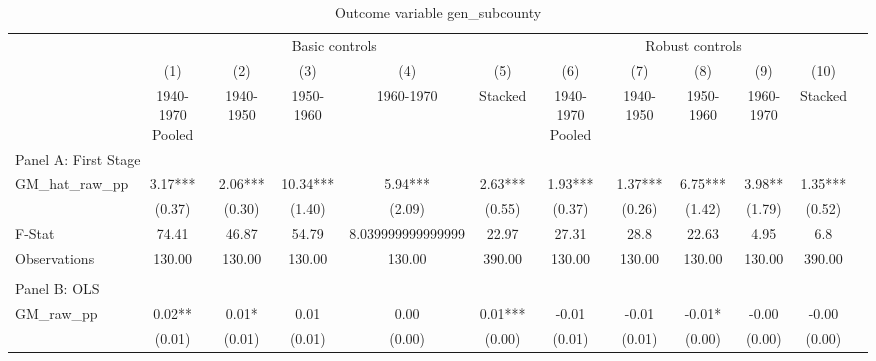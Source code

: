 \begin{table}[htbp]\centering {} \begin{threeparttable} \caption{Outcome variable gen\_subcounty } \begin{tabular}{l*{11}{c}} \toprule
          &\multicolumn{5}{c}{Basic controls}                                   &\multicolumn{5}{c}{Robust controls}                                  \\\cmidrule(lr){2-6}\cmidrule(lr){7-11}
          &\multicolumn{1}{c}{(1)}&\multicolumn{1}{c}{(2)}&\multicolumn{1}{c}{(3)}&\multicolumn{1}{c}{(4)}&\multicolumn{1}{c}{(5)}&\multicolumn{1}{c}{(6)}&\multicolumn{1}{c}{(7)}&\multicolumn{1}{c}{(8)}&\multicolumn{1}{c}{(9)}&\multicolumn{1}{c}{(10)}\\
          &\multicolumn{1}{c}{1940-1970 Pooled}&\multicolumn{1}{c}{1940-1950}&\multicolumn{1}{c}{1950-1960}&\multicolumn{1}{c}{1960-1970}&\multicolumn{1}{c}{Stacked}&\multicolumn{1}{c}{1940-1970 Pooled}&\multicolumn{1}{c}{1940-1950}&\multicolumn{1}{c}{1950-1960}&\multicolumn{1}{c}{1960-1970}&\multicolumn{1}{c}{Stacked}\\
\cmidrule(lr){1-11}
\multicolumn{10}{l}{Panel A: First Stage}\\
\cmidrule(lr){1-11}
GM\_hat\_raw\_pp&      3.17***&      2.06***&     10.34***&      5.94***&      2.63***&      1.93***&      1.37***&      6.75***&      3.98** &      1.35***\\
          &    (0.37)   &    (0.30)   &    (1.40)   &    (2.09)   &    (0.55)   &    (0.37)   &    (0.26)   &    (1.42)   &    (1.79)   &    (0.52)   \\
\midrule
F-Stat    &     74.41   &     46.87   &     54.79   &8.039999999999999   &     22.97   &     27.31   &      28.8   &     22.63   &      4.95   &       6.8   \\
Observations&    130.00   &    130.00   &    130.00   &    130.00   &    390.00   &    130.00   &    130.00   &    130.00   &    130.00   &    390.00   \\
\cmidrule[\heavyrulewidth](lr){1-11} \\ \cmidrule[\heavyrulewidth](lr){1-11}
\multicolumn{10}{l}{Panel B: OLS}\\
\cmidrule(lr){1-11}
GM\_raw\_pp &      0.02** &      0.01*  &      0.01   &      0.00   &      0.01***&     -0.01   &     -0.01   &     -0.01*  &     -0.00   &     -0.00   \\
          &    (0.01)   &    (0.01)   &    (0.01)   &    (0.00)   &    (0.00)   &    (0.01)   &    (0.01)   &    (0.00)   &    (0.00)   &    (0.00)   \\

\end{tabular}
\end{threeparttable}
\end{table}
